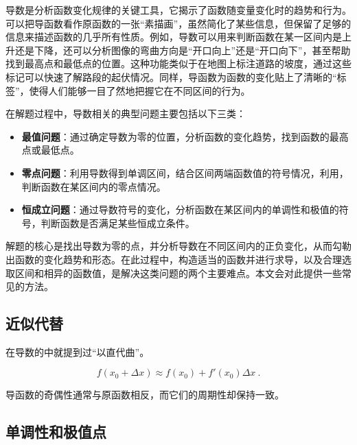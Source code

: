 
\begin{issues}
\issueDraft
\end{issues}


导数是分析函数变化规律的关键工具，它揭示了函数随变量变化时的趋势和行为。可以把导函数看作原函数的一张“素描画”，虽然简化了某些信息，但保留了足够的信息来描述函数的几乎所有性质。例如，导数可以用来判断函数在某一区间内是上升还是下降，还可以分析图像的弯曲方向是“开口向上”还是“开口向下”，甚至帮助找到最高点和最低点的位置。这种功能类似于在地图上标注道路的坡度，通过这些标记可以快速了解路段的起伏情况。同样，导函数为函数的变化贴上了清晰的“标签”，使得人们能够一目了然地把握它在不同区间的行为。

在解题过程中，导数相关的典型问题主要包括以下三类：

\begin{itemize}
\item \textbf{最值问题}：通过确定导数为零的位置，分析函数的变化趋势，找到函数的最高点或最低点。
\item \textbf{零点问题}：利用导数得到单调区间，结合区间两端函数值的符号情况，利用，判断函数在某区间内的零点情况。
\item \textbf{恒成立问题}：通过导数符号的变化，分析函数在某区间内的单调性和极值的符号，判断函数是否满足某些恒成立条件。
\end{itemize}

解题的核心是找出导数为零的点，并分析导数在不同区间内的正负变化，从而勾勒出函数的变化趋势和形态。在此过程中，构造适当的函数并进行求导，以及合理选取区间和相异的函数值，是解决这类问题的两个主要难点。本文会对此提供一些常见的方法。

\subsection{近似代替}

在导数的中就提到过“以直代曲”。

\begin{equation}
f(x_0+\Delta x)\approx f(x_0)+f'(x_0)\Delta x~.
\end{equation}

导函数的奇偶性通常与原函数相反，而它们的周期性却保持一致。

\subsection{单调性和极值点}

